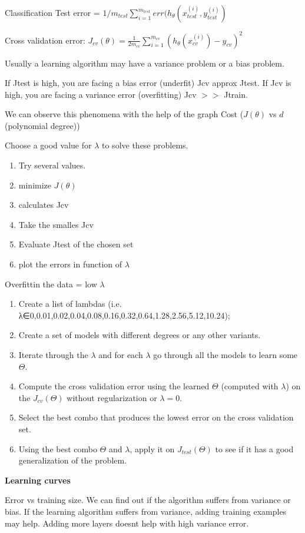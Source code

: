 \documentclass[12pt,a4paper]{report}
\begin{document}
Classification Test error = $1/m_{test}\sum_{i=1}^ {m_{test}}err(h_\theta(x_{test}^{(i)}, y_{test}^{(i)})$

Cross validation error: $J_{cv}(\theta) = \frac{1}{2m_{cv}}\sum_{i=1}^ {m_{cv}}(h_\theta(x_{cv}^{(i)}) - y_{cv})^{2}$

Usually a learning algorithm may have a variance problem or a bias problem.

If Jtest is high, you are facing a bias error (underfit) Jcv approx Jtest. If Jcv is high, you are facing a variance error (overfitting) Jcv $>>$ Jtrain.
	
	We can observe this phenomena with the help of the graph Cost ($J(\theta)$ vs $d$ (polynomial degree))
	
	Choose a good value for $\lambda$ to solve these problems. 
\begin{enumerate}
\item Try several values.
\item minimize $J(\theta)$
\item calculates Jcv
\item Take the smalles Jcv
\item Evaluate Jtest of the chosen set
\item plot the errors in function of $\lambda$
\end{enumerate}	
	
	Overfittin the data  = low $\lambda$
	\begin{enumerate}
	\item Create a list of lambdas (i.e. λ∈{0,0.01,0.02,0.04,0.08,0.16,0.32,0.64,1.28,2.56,5.12,10.24});
\item Create a set of models with different degrees or any other variants.
\item Iterate through the $\lambda$ and for each $\lambda$ go through all the models to learn some $\Theta$.
\item Compute the cross validation error using the learned $\Theta$ (computed with $\lambda$) on the $J_{cv}(\Theta)$ without regularization or $\lambda = 0$.
\item Select the best combo that produces the lowest error on the cross validation set.
\item Using the best combo $\Theta$ and $\lambda$, apply it on $J_{test}(\Theta)$ to see if it has a good generalization of the problem.
	\end{enumerate}	
	
	
	\textbf{Learning curves}	
	
	Error vs training size. We can find out if the algorithm suffers from variance or bias. If the learning algorithm suffers from variance, adding training examples may help. Adding more layers doesnt help with high variance error.
	
\end{document}
